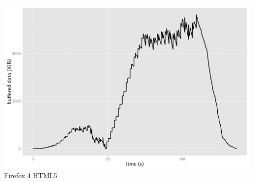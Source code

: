 \documentclass{beamer}
\begin{document}
\begin{frame}
\begin{columns}[T]
			\includegraphics[width=0.75\columnwidth]{../../chapters/03-streaming/images/R-bufferlevel-firefox.pdf}\\
			Firefox 4 HTML5
	\end{columns}
\end{frame}
\end{document}
